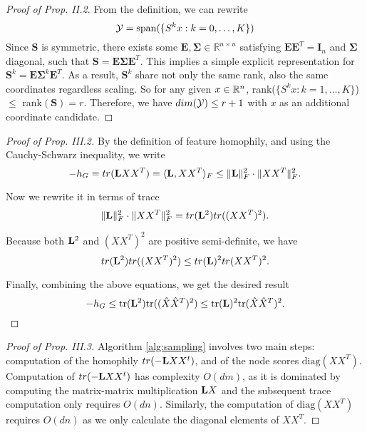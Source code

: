 \documentclass[conference]{IEEEtran}
\theoremstyle{definition}
\begin{document}
\appendix 
\begin{proof}[Proof of Prop. II.2]
  From the definition, we can rewrite 
    $${\mathcal Y} = \text{span}(\{S^kx : k=0, \ldots, K\})$$
    Since $\mathbf{S}$ is symmetric, there exists some $\mathbf{E}, \mathbf{\Sigma} \in \mathbb{R}^{n \times n}$ satisfying $\mathbf{E}\mathbf{E}^T = \mathbf{I}_n$ and $\mathbf{\Sigma}$ diagonal, such that $\mathbf{S} = \mathbf{E}\mathbf{\Sigma}\mathbf{E}^T$. This implies a simple explicit representation for $\mathbf{S}^k = \mathbf{E}\mathbf{\Sigma}^k\mathbf{E}^T$. As a result, $\mathbf{S}^k$ share not only the same rank, also the same coordinates regardless scaling. So for any given $x\in {\mathbb R}^n$, rank($\{S^kx : k=1, \ldots, K\}$) $\leq$ rank$(\mathbf{S}) = r$. Therefore, we have $dim({\mathcal Y}) \leq r+1$ with $x$ as an additional coordinate candidate.
\end{proof}

\begin{proof}[Proof of Prop. III.2]
By the definition of feature homophily, and using the Cauchy-Schwarz inequality, we write
\begin{equation}
    -h_{G} = tr({\mathbf L} XX^T) = \langle {\ensuremath{\mathbf L}}, XX^T \rangle_F \leq \| {\mathbf L} \|_F^2 \cdot \|XX^T\|_F^2 \text{.}
\end{equation}

Now we rewrite it in terms of trace
\begin{equation}
    \| {\mathbf L} \|_F^2 \cdot \|XX^T\|_F^2 = tr({\mathbf L}^2) tr((XX^T)^2) \text{.}
\end{equation}

Because both ${\mathbf L}^2$ and $(XX^T)^2$ are positive semi-definite, we have
\begin{equation}
    tr({\mathbf L}^2) tr((XX^T)^2) \leq tr({\mathbf L})^2tr(XX^T)^2 \text{.}
\end{equation}

Finally, combining the above equations, we get the desired result
    \begin{equation}
        -h_G \leq \text{tr}({\mathbf L}^2)\text{tr}((\hat{X}\hat{X}^T)^2) \leq \text{tr}({\mathbf L})^2\text{tr}(\hat{X}\hat{X}^T)^2 \text{.}
    \end{equation}
\end{proof}

\begin{proof}[Proof of Prop. III.3]
Algorithm \ref{alg:sampling} involves two main steps: computation of the homophily $tr(-{\mathbf L} XX^t)$, and of the node scores $\mbox{diag}(XX^T)$. Computation of $tr(-{\mathbf L} XX^t)$ has complexity $O(dm)$, as it is dominated by computing the matrix-matrix multiplication ${\mathbf L} X$ and the subsequent trace computation only requires $O(dn)$. Similarly, the computation of $\mbox{diag}(XX^T)$ requires $O(dn)$ as we only calculate the diagonal elements of $XX^T$.
\end{proof}
\end{document}
